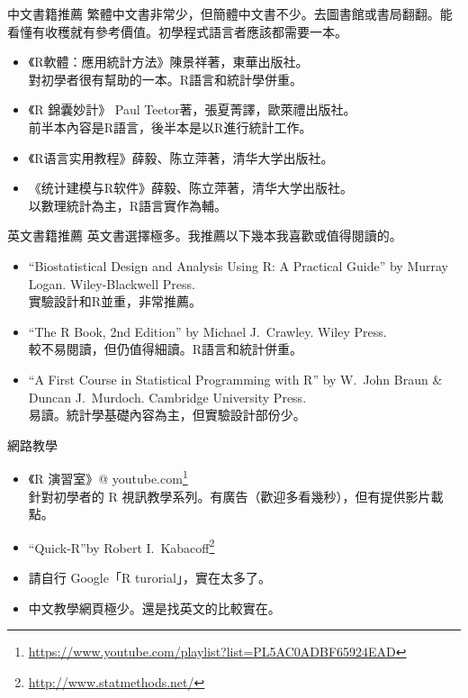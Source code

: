 \documentclass[14pt, aspectratio=43]{beamer}
\let\oldfootnote\footnote
\renewcommand\footnote[1]{\hspace{-0.7em}\oldfootnote{\ignorespaces#1}\hspace{0.5em}}
\begin{document}
\begin{frame}{中文書籍推薦}
繁體中文書非常少，但簡體中文書不少。去圖書館或書局翻翻。能看懂有收穫就有參考價值。初學程式語言者應該都需要一本。
\begin{itemize}
\item 《R軟體：應用統計方法》陳景祥著，東華出版社。\\ 對初學者很有幫助的一本。R語言和統計學併重。
\item 《R 錦囊妙計》 Paul Teetor著，張夏菁譯，歐萊禮出版社。\\ 前半本內容是R語言，後半本是以R進行統計工作。
\item {《R语言实用教程》薛毅、陈立萍著，清华大学出版社。}
\item {《统计建模与R软件》薛毅、陈立萍著，清华大学出版社。} \\ 以數理統計為主，R語言實作為輔。
\end{itemize}
\end{frame}

\begin{frame}{英文書籍推薦}
英文書選擇極多。我推薦以下幾本我喜歡或值得閱讀的。
\begin{itemize}
\item ``Biostatistical Design and Analysis Using R: A Practical Guide'' by Murray Logan. Wiley-Blackwell Press.\\ 實驗設計和R並重，非常推薦。
\item ``The R Book, 2nd Edition'' by Michael J.~Crawley. Wiley Press. \\ 較不易閱讀，但仍值得細讀。R語言和統計併重。
\item ``A First Course in Statistical Programming with R'' by W.~John Braun \& Duncan J.~Murdoch. Cambridge University Press. \\ 易讀。統計學基礎內容為主，但實驗設計部份少。
\end{itemize}
\end{frame}


\begin{frame}{網路教學}
\begin{itemize}
\item 《R 演習室》\makeatletter @ \makeatother youtube.com\oldfootnote{\url{https://www.youtube.com/playlist?list=PL5AC0ADBF65924EAD}} \\ 針對初學者的 R 視訊教學系列。有廣告（歡迎多看幾秒），但有提供影片載點。
\item ``Quick-R''by Robert I.~Kabacoff\oldfootnote{\url{http://www.statmethods.net/}}
\item 請自行 Google「R turorial」，實在太多了。
\item 中文教學網頁極少。還是找英文的比較實在。
\end{itemize}
\end{frame}
\end{document}
